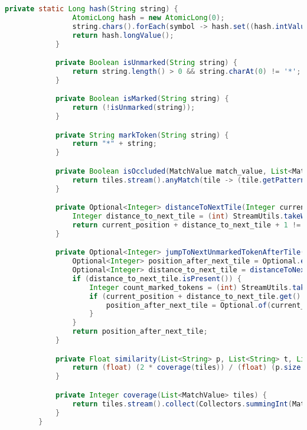 \begin{lstlisting}[language=java]
            private static Long hash(String string) {
                AtomicLong hash = new AtomicLong(0);
                string.chars().forEach(symbol -> hash.set((hash.intValue() << 1) + symbol));
                return hash.longValue();
            }

            private Boolean isUnmarked(String string) {
                return string.length() > 0 && string.charAt(0) != '*';
            }

            private Boolean isMarked(String string) {
                return (!isUnmarked(string));
            }

            private String markToken(String string) {
                return "*" + string;
            }

            private Boolean isOccluded(MatchValue match_value, List<MatchValue> tiles) {
                return tiles.stream().anyMatch(tile -> (tile.getPatternPosition() + tile.getLengthMatch() == match_value.getPatternPosition() + match_value.getLengthMatch()) && (tile.getTextPosition() + tile.getLengthMatch() == match_value.getTextPosition() + match_value.getLengthMatch()));
            }

            private Optional<Integer> distanceToNextTile(Integer current_position, List<String> tokens) {
                Integer distance_to_next_tile = (int) StreamUtils.takeWhile(tokens.stream().skip(current_position + 1), this::isUnmarked).count();
                return current_position + distance_to_next_tile + 1 != tokens.size() ? Optional.of(distance_to_next_tile + 1) : Optional.empty();
            }

            private Optional<Integer> jumpToNextUnmarkedTokenAfterTile(Integer current_position, List<String> tokens) {
                Optional<Integer> position_after_next_tile = Optional.empty();
                Optional<Integer> distance_to_next_tile = distanceToNextTile(current_position, tokens);
                if (distance_to_next_tile.isPresent()) {
                    Integer count_marked_tokens = (int) StreamUtils.takeWhile(tokens.stream().skip(current_position + distance_to_next_tile.get() + 1), this::isMarked).count();
                    if (current_position + distance_to_next_tile.get() + count_marked_tokens + 1 <= tokens.size() - 1) {
                        position_after_next_tile = Optional.of(current_position + distance_to_next_tile.get() + count_marked_tokens + 1);
                    }
                }
                return position_after_next_tile;
            }

            private Float similarity(List<String> p, List<String> t, List<MatchValue> tiles) {
                return (float) (2 * coverage(tiles)) / (float) (p.size() + t.size());
            }

            private Integer coverage(List<MatchValue> tiles) {
                return tiles.stream().collect(Collectors.summingInt(MatchValue::getLengthMatch));
            }
        }
        
    \end{lstlisting}  

